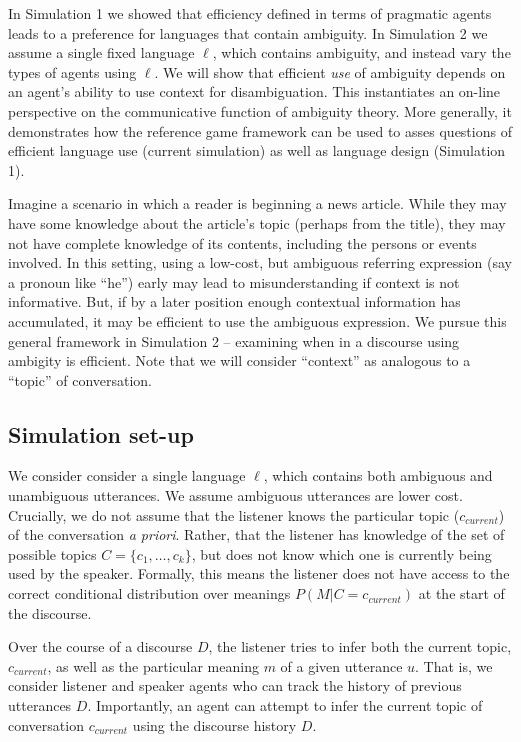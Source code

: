 \documentclass[10pt, letterpaper]{article}
\begin{document}
In Simulation 1 we showed that efficiency defined in terms of pragmatic
agents leads to a preference for languages that contain ambiguity. In
Simulation 2 we assume a single fixed language \(\ell\), which contains
ambiguity, and instead vary the types of agents using \(\ell\). We will
show that efficient \emph{use} of ambiguity depends on an agent's
ability to use context for disambiguation. This instantiates an on-line
perspective on the communicative function of ambiguity theory. More
generally, it demonstrates how the reference game framework can be used
to asses questions of efficient language use (current simulation) as
well as language design (Simulation 1).\par

Imagine a scenario in which a reader is beginning a news article. While
they may have some knowledge about the article's topic (perhaps from the
title), they may not have complete knowledge of its contents, including
the persons or events involved. In this setting, using a low-cost, but
ambiguous referring expression (say a pronoun like ``he'') early may
lead to misunderstanding if context is not informative. But, if by a
later position enough contextual information has accumulated, it may be
efficient to use the ambiguous expression. We pursue this general
framework in Simulation 2 -- examining when in a discourse using
ambigity is efficient. Note that we will consider ``context'' as
analogous to a ``topic'' of conversation. \par

\subsection{Simulation set-up}\label{simulation-set-up-1}

We consider consider a single language \(\ell\), which contains both
ambiguous and unambiguous utterances. We assume ambiguous utterances are
lower cost. Crucially, we do not assume that the listener knows the
particular topic (\(c_{current}\)) of the conversation
\textit{a priori}. Rather, that the listener has knowledge of the set of
possible topics \(C = \{c_1, \dots, c_k\}\), but does not know which one
is currently being used by the speaker. Formally, this means the
listener does not have access to the correct conditional distribution
over meanings \(P(M|C=c_{current})\) at the start of the discourse.\par 

Over the course of a discourse \(D\), the listener tries to infer both
the current topic, \(c_{current}\), as well as the particular meaning
\(m\) of a given utterance \(u\). That is, we consider listener and
speaker agents who can track the history of previous utterances \(D\).
Importantly, an agent can attempt to infer the current topic of
conversation \(c_{current}\) using the discourse history \(D\).\par
\end{document}
